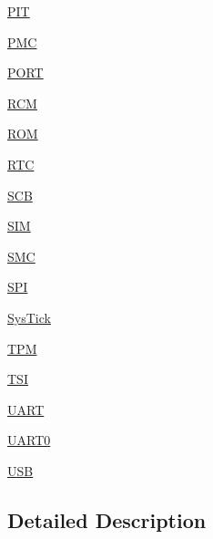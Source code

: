 \begin{DoxyCompactItemize}
\item 
\hyperlink{group___p_i_t___peripheral}{P\+I\+T}
\item 
\hyperlink{group___p_m_c___peripheral}{P\+M\+C}
\item 
\hyperlink{group___p_o_r_t___peripheral}{P\+O\+R\+T}
\item 
\hyperlink{group___r_c_m___peripheral}{R\+C\+M}
\item 
\hyperlink{group___r_o_m___peripheral}{R\+O\+M}
\item 
\hyperlink{group___r_t_c___peripheral}{R\+T\+C}
\item 
\hyperlink{group___s_c_b___peripheral}{S\+C\+B}
\item 
\hyperlink{group___s_i_m___peripheral}{S\+I\+M}
\item 
\hyperlink{group___s_m_c___peripheral}{S\+M\+C}
\item 
\hyperlink{group___s_p_i___peripheral}{S\+P\+I}
\item 
\hyperlink{group___sys_tick___peripheral}{Sys\+Tick}
\item 
\hyperlink{group___t_p_m___peripheral}{T\+P\+M}
\item 
\hyperlink{group___t_s_i___peripheral}{T\+S\+I}
\item 
\hyperlink{group___u_a_r_t___peripheral}{U\+A\+R\+T}
\item 
\hyperlink{group___u_a_r_t0___peripheral}{U\+A\+R\+T0}
\item 
\hyperlink{group___u_s_b___peripheral}{U\+S\+B}
\end{DoxyCompactItemize}


\subsection{Detailed Description}
